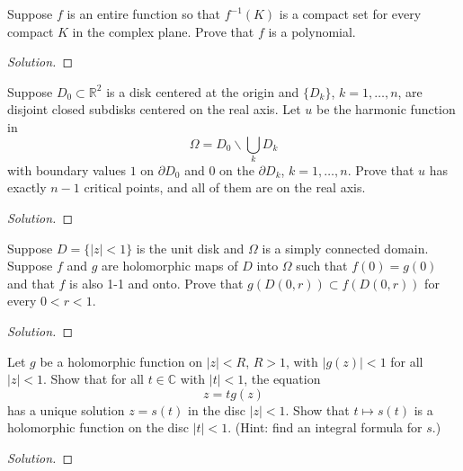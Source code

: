 \documentclass[10pt]{article}
\newenvironment{soln}{\begin{proof}[Solution]}{\end{proof}}
\begin{document}
\begin{problem}
[1999 J-I-3]
Suppose $f$ is an entire function so that $f^{-1}(K)$ is a compact set for every compact $K$ in the complex plane. Prove that $f$ is a polynomial.
\end{problem}

\begin{soln}

\end{soln}



\begin{problem}
[1999 J-II-6]
Suppose $D_0\subset \mathbb{R}^2$ is a disk centered at the origin and $\{D_k\}$, $k=1,\ldots,n$, are disjoint closed subdisks centered on the real axis. Let $u$ be the harmonic function in
$$
\Omega=D_0\backslash\bigcup_k D_k
$$
with boundary values $1$ on $\partial D_0$ and $0$ on the $\partial D_k$, $k=1,\ldots,n$. Prove that $u$ has exactly $n-1$ critical points, and all of them are on the real axis.
\end{problem}

\begin{soln}

\end{soln}



\begin{problem}
[1999 A-I-3]
Suppose $D=\{|z|<1\}$ is the unit disk and $\Omega$ is a simply connected domain. Suppose $f$ and $g$ are holomorphic maps of $D$ into $\Omega$ such that $f(0)=g(0)$ and that $f$ is also 1-1 and onto. Prove that $g(D(0,r))\subset f(D(0,r))$ for every $0< r<1$.
\end{problem}

\begin{soln}

\end{soln}



\begin{problem}
[1999 A-II-5]
Let $g$ be a holomorphic function on $|z|< R$, $R>1$, with $|g(z)|<1$ for all $|z|<1$. Show that for all $t\in\mathbb{C}$ with $|t|<1$, the equation
$$
z=tg(z)
$$
has a unique solution $z=s(t)$ in the disc $|z|<1$. Show that $t\mapsto s(t)$ is a holomorphic function on the disc $|t|<1$. (Hint: find an integral formula for $s$.)
\end{problem}

\begin{soln}

\end{soln}
\end{document}
